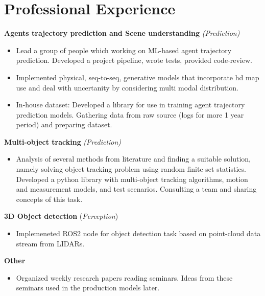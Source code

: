 \section*{\sectionformat Professional Experience}
% 

\textbf{Agents trajectory prediction and Scene understanding} \textit{(Prediction)}
\begin{itemize}
    \item Lead a group of people which working on ML-based agent trajectory prediction. Developed a project pipeline, wrote tests, provided code-review.
    \item Implemented physical, seq-to-seq, generative models that incorporate hd map use and deal with uncertanity by considering multi modal distribution.
    \item In-house dataset: Developed a library for use in training agent trajectory prediction models. Gathering data from raw source (logs for more 1 year period) and preparing dataset.
\end{itemize}

\textbf{Multi-object tracking} \textit{(Prediction)}
\begin{itemize}
    \item Analysis of several methods from literature and finding a suitable solution, namely solving object tracking problem using random finite set statistics. Developed a python library with multi-object tracking algorithms, motion and measurement models, and test scenarios. Consulting a team and sharing concepts of this task.
\end{itemize}

\textbf{3D Object detection} (\textit{Perception})
\begin{itemize}
    \item Implemeneted ROS2 node for object detection task based on point-cloud data stream from LIDARs.
\end{itemize}

\textbf{Other}
\begin{itemize}
    \item Organized weekly research papers reading seminars. Ideas from these seminars used in the production models later.
\end{itemize}

